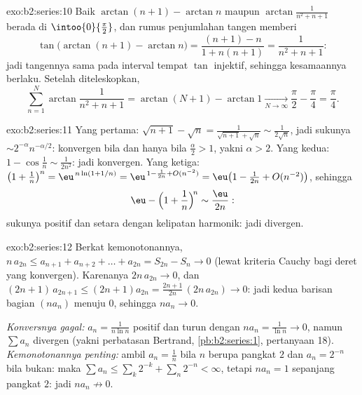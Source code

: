 \begin{solution}{exo:b2:series:10}
Baik $\arctan(n+1) - \arctan n$ maupun
$\arctan\frac{1}{n^2+n+1}$ berada di $\intoo{0}{\frac\pi2}$, dan
rumus penjumlahan tangen memberi
\[
\tan\bigl(\arctan(n{+}1) - \arctan n\bigr)
= \frac{(n+1) - n}{1 + n(n+1)} = \frac{1}{n^2 + n + 1} :
\]
jadi tangennya sama pada interval tempat $\tan$ injektif, sehingga
kesamaannya berlaku. Setelah diteleskopkan,
\[
\sum_{n=1}^{N}\arctan\frac{1}{n^2+n+1}
= \arctan(N{+}1) - \arctan 1 \xrightarrow[N\to\infty]{}
\frac\pi2 - \frac\pi4 = \frac\pi4 .
\]

\end{solution}

\begin{solution}{exo:b2:series:11}
Yang pertama: $\sqrt{n+1} - \sqrt n = \frac{1}{\sqrt{n+1} + \sqrt n}
\sim \frac{1}{2\sqrt n}$, jadi sukunya $\sim
2^{-\alpha}n^{-\alpha/2}$: konvergen bila dan hanya bila $\frac\alpha2 >
1$, yakni $\alpha > 2$. Yang kedua: $1 - \cos\frac1n \sim
\frac{1}{2n^2}$: jadi konvergen. Yang ketiga: $\bigl(1 +
\frac1n\bigr)^n = \eu^{\,n\ln(1 + 1/n)} = \eu^{\,1 - \frac1{2n} +
O(n^{-2})} = \eu\bigl(1 - \frac{1}{2n} + O(n^{-2})\bigr)$, sehingga
\[
\eu - \Bigl(1 + \frac1n\Bigr)^{\!n} \sim \frac{\eu}{2n} :
\]
sukunya positif dan setara dengan kelipatan harmonik: jadi divergen.
\end{solution}

\begin{solution}{exo:b2:series:12}
Berkat kemonotonannya, $n\,a_{2n} \leq a_{n+1} + a_{n+2} + \dots +
a_{2n} = S_{2n} - S_n \to 0$ (lewat kriteria Cauchy bagi deret yang
konvergen). Karenanya $2n\,a_{2n} \to 0$, dan $(2n{+}1)\,
a_{2n+1} \leq (2n{+}1)a_{2n} = \frac{2n+1}{2n}\,(2n\,a_{2n}) \to
0$: jadi kedua barisan bagian $(na_n)$ menuju $0$, sehingga $na_n \to 0$.

\emph{Konversnya gagal:} $a_n = \frac1{n\ln n}$ positif dan
turun dengan $na_n = \frac1{\ln n} \to 0$, namun $\sum a_n$
divergen (yakni perbatasan Bertrand, \cref{pb:b2:series:1}, pertanyaan
18). \emph{Kemonotonannya penting:} ambil $a_n = \frac1n$ bila $n$
berupa pangkat $2$ dan $a_n = 2^{-n}$ bila bukan: maka $\sum a_n \leq
\sum_k 2^{-k} + \sum_n 2^{-n} < \infty$, tetapi $na_n = 1$ sepanjang
pangkat $2$: jadi $na_n \not\to 0$.
\end{solution}

